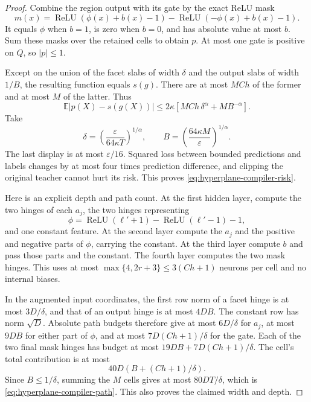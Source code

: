 \begin{proof}
Combine the region output with its gate by the exact ReLU mask
\[
 m(x)=\operatorname{ReLU}(\phi(x)+b(x)-1)
      -\operatorname{ReLU}(-\phi(x)+b(x)-1).
\]
It equals $\phi$ when $b=1$, is zero when $b=0$, and has absolute value at most $b$. Sum these masks over the retained cells to obtain $p$. At most one gate is positive on $Q$, so $|p|\le1$.

Except on the union of the facet slabs of width $\delta$ and the output slabs of width $1/B$, the resulting function equals $s(g)$. There are at most $MCh$ of the former and at most $M$ of the latter. Thus
\[
 \mathbb E|p(X)-s(g(X))|
 \le2\kappa\left[MCh\,\delta^\alpha+MB^{-\alpha}\right].
\]
Take
\[
 \delta=\left(\frac{\varepsilon}{64\kappa T}\right)^{1/\alpha},
 \qquad B=\left(\frac{64\kappa M}{\varepsilon}\right)^{1/\alpha}.
\]
The last display is at most $\varepsilon/16$. Squared loss between bounded predictions and labels changes by at most four times prediction difference, and clipping the original teacher cannot hurt its risk. This proves \eqref{eq:hyperplane-compiler-risk}.

Here is an explicit depth and path count. At the first hidden layer, compute the two hinges of each $a_j$, the two hinges representing
\[
 \phi=\operatorname{ReLU}(\ell'+1)-\operatorname{ReLU}(\ell'-1)-1,
\]
and one constant feature. At the second layer compute the $a_j$ and the positive and negative parts of $\phi$, carrying the constant. At the third layer compute $b$ and pass those parts and the constant. The fourth layer computes the two mask hinges. This uses at most $\max\{4,2r+3\}\le3(Ch+1)$ neurons per cell and no internal biases.

In the augmented input coordinates, the first row norm of a facet hinge is at most $3D/\delta$, and that of an output hinge is at most $4DB$. The constant row has norm $\sqrt D$. Absolute path budgets therefore give at most $6D/\delta$ for $a_j$, at most $9DB$ for either part of $\phi$, and at most $7D(Ch+1)/\delta$ for the gate. Each of the two final mask hinges has budget at most $19DB+7D(Ch+1)/\delta$. The cell's total contribution is at most
\[
 40D\left(B+(Ch+1)/\delta\right).
\]
Since $B\le1/\delta$, summing the $M$ cells gives at most
$80DT/\delta$, which is \eqref{eq:hyperplane-compiler-path}. This also proves the claimed width and depth.
\end{proof}

